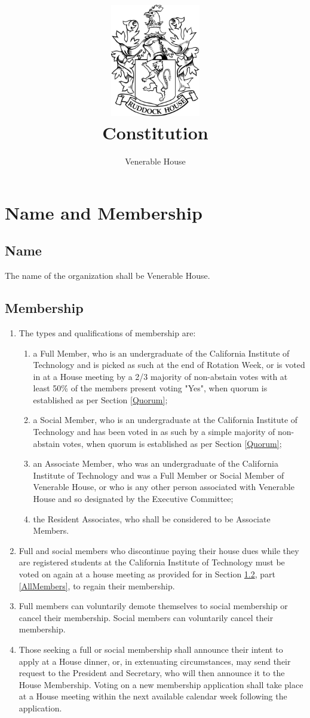 \documentclass[10pt]{article} %
\title{\includegraphics[width=1.55in]{venerable_crest.png} \\ Constitution}
\author{Venerable House}
\begin{document}
\maketitle

\section{Name and Membership}
\subsection{Name}
The name of the organization shall be Venerable House.
\subsection{Membership}
\label{Membership}
\begin{enumerate}
\item \label{AllMembers} The types and qualifications of membership are:
\begin{enumerate}
\item \label{FullMember} a Full Member, who is an undergraduate of the California Institute of Technology and is picked as such at the end of Rotation Week, or is voted in at a House meeting by a 2/3 majority of non-abstain votes with at least 50\% of the members present voting "Yes", when quorum is established as per Section \ref{Quorum};
\item a Social Member, who is an undergraduate at the California Institute of Technology and has been voted in as such by a simple majority of non-abstain votes, when quorum is established as per Section \ref{Quorum};
\item an Associate Member, who was an undergraduate of the California Institute of Technology and was a Full Member or Social Member of Venerable House, or who is any other person associated with Venerable House and so designated by the Executive Committee;
\item the Resident Associates, who shall be considered to be Associate Members.
\end{enumerate}
\item Full and social members who discontinue paying their house dues while they are registered students at the California Institute of Technology must be voted on again at a house meeting as provided for in Section \ref{Membership}, part \ref{AllMembers}, to regain their membership.
\item Full members can voluntarily demote themselves to social membership or cancel their membership. Social members can voluntarily cancel their membership.
\item Those seeking a full or social membership shall announce their intent to apply at a House dinner, or, in extenuating circumstances, may send their request to the President and Secretary, who will then announce it to the House Membership. Voting on a new membership application shall take place at a House meeting within the next available calendar week following the application.
\end{enumerate}
\end{document}
